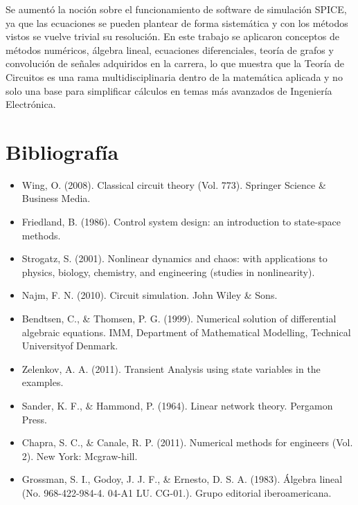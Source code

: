 \documentclass[10pt,a4paper]{article} %
\begin{document}
	Se aumentó la noción sobre el funcionamiento de software de simulación SPICE, ya que las ecuaciones se pueden plantear de forma sistemática y con los métodos vistos se vuelve trivial su resolución. En este trabajo se aplicaron conceptos de métodos numéricos, álgebra lineal, ecuaciones diferenciales, teoría de grafos y convolución de señales adquiridos en la carrera, lo que muestra que la Teoría de Circuitos es una rama multidisciplinaria dentro de la matemática aplicada y no solo una base para simplificar cálculos en temas más avanzados de Ingeniería Electrónica.
	
	\section{Bibliografía}
	\begin{itemize}
		\item	Wing, O. (2008). Classical circuit theory (Vol. 773). Springer Science \& Business Media.
		\item Friedland, B. (1986). Control system design: an introduction to state-space methods.
		\item Strogatz, S. (2001). Nonlinear dynamics and chaos: with applications to physics, biology, chemistry, and engineering (studies in nonlinearity).
		\item  Najm, F. N. (2010). Circuit simulation. John Wiley \& Sons.
		\item Bendtsen, C., \& Thomsen, P. G. (1999). Numerical solution of differential algebraic equations. IMM, Department of Mathematical Modelling, Technical Universityof Denmark.
		\item Zelenkov, A. A. (2011). Transient Analysis using state variables in the examples.
		\item Sander, K. F., \& Hammond, P. (1964). Linear network theory. Pergamon Press.
		\item Chapra, S. C., \& Canale, R. P. (2011). Numerical methods for engineers (Vol. 2). New York: Mcgraw-hill.
		\item Grossman, S. I., Godoy, J. J. F., \& Ernesto, D. S. A. (1983). Álgebra lineal (No. 968-422-984-4. 04-A1 LU. CG-01.). Grupo editorial iberoamericana.
	\end{itemize}
\end{document}
